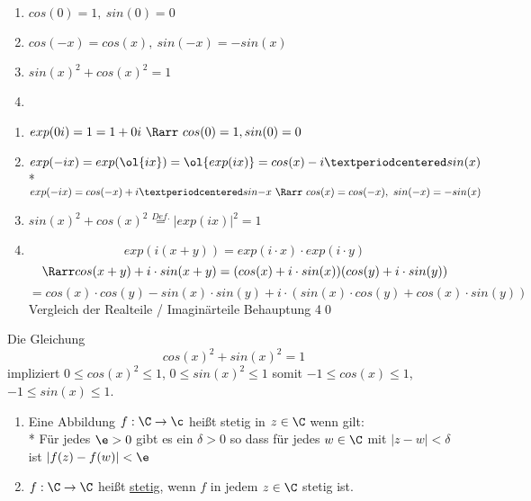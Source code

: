 \begin{enumerate}
\item{$cos(0)=1,\ sin(0)=0$
}
\item{$cos(-x)=cos(x),\ sin(-x)=-sin(x)$}
\item{$sin(x)^2+cos(x)^2=1$
}
\item{}
\end{enumerate}
\bew
\begin{enumerate}
\item{$exp(0i)=1=1+0i\ \Rarr\ cos(0)=1, sin(0)=0$}
\item{$exp(-ix)=exp(\ol{ix})=\ol{exp(ix)}=cos(x)-i·sin(x)$\\*
$exp(-ix)=cos(-x)+i·sin{-x}\ \Rarr\ cos(x)=cos(-x),\ sin(-x)=-sin(x)$}
\item{$sin(x)^2+cos(x)^2\overset{Def.}{=}|exp(ix)|^2=1$}
\item{$$exp(i(x+y)) = exp(i \cdot x) \cdot exp(i \cdot y)$$
$$\Rarr cos(x+y) + i \cdot sin(x+y) = (cos(x) + i \cdot sin(x))(cos(y) + i \cdot sin(y))$$
$$=cos(x) \cdot cos(y) - sin(x) \cdot sin(y) + i \cdot (sin(x) \cdot cos(y) + cos(x) \cdot sin(y))$$
Vergleich der Realteile / Imaginärteile \Rarr{} Behauptung 4\qed}
\end{enumerate}

\bem
	Die Gleichung $$cos(x)^2 + sin(x)^2 = 1$$
	impliziert $0 \leq cos(x)^2 \leq 1$, $0 \leq sin(x)^2 \leq 1$ somit $-1 \leq cos(x) \leq 1$, $-1 \leq sin(x) \leq 1$.

	\begin{enumerate}
	\item{Eine Abbildung $f: \C \to \c$ heißt stetig in $z \in \C$ wenn gilt:\\*
	Für jedes $\e > 0$ gibt es ein $\delta > 0$ so dass für jedes $w \in \C$ mit $|z - w| < \delta$ ist $|f(z) - f(w)| < \e$}
	\item{$f: \C \to \C$ heißt \ul{stetig}, wenn $f$ in jedem $z \in \C$ stetig ist.}
	\end{enumerate}

